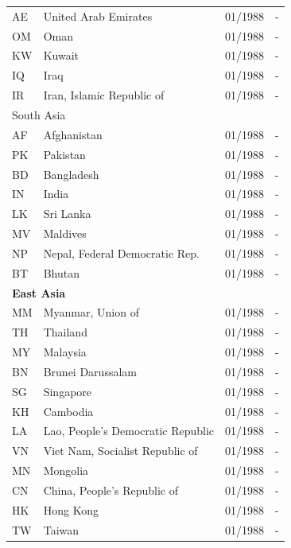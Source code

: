 \begin{scriptsize}
\begin{longtable}{lp{8.8cm}p{2cm}p{2cm}}
	AE & United Arab Emirates                   & 01/1988 & -  \\
	OM & Oman                                   & 01/1988 & -  \\
	KW & Kuwait                                 & 01/1988 & -  \\
	IQ & Iraq                                   & 01/1988 & -  \\
	IR & Iran, Islamic Republic of              & 01/1988 & -  \\
	\midrule
	\multicolumn{3}{l}{South Asia}  &  \\
	AF & Afghanistan                    & 01/1988 & -  \\
	PK & Pakistan                       & 01/1988 & -  \\
	BD & Bangladesh                     & 01/1988 & -  \\
	IN & India                          & 01/1988 & -  \\
	LK & Sri Lanka                      & 01/1988 & -  \\
	MV & Maldives                       & 01/1988 & -  \\
	NP & Nepal, Federal Democratic Rep. & 01/1988 & -  \\
	BT & Bhutan                         & 01/1988 & -  \\
	\midrule
	\multicolumn{3}{l}{\textbf{East Asia}}  &  \\
	MM & Myanmar, Union of                      & 01/1988 & -  \\
	TH & Thailand                               & 01/1988 & -  \\
	MY & Malaysia                               & 01/1988 & -  \\
	BN & Brunei Darussalam                      & 01/1988 & -  \\
	SG & Singapore                              & 01/1988 & -  \\
	KH & Cambodia                               & 01/1988 & -  \\
	LA & Lao, People's Democratic Republic      & 01/1988 & -  \\
	VN & Viet Nam, Socialist Republic of        & 01/1988 & -  \\
	MN & Mongolia                               & 01/1988 & -  \\
	CN & China, People's Republic of            & 01/1988 & -  \\
	HK & Hong Kong                              & 01/1988 & -  \\
	TW & Taiwan                                 & 01/1988 & -  \\

\end{longtable}
\end{scriptsize}
